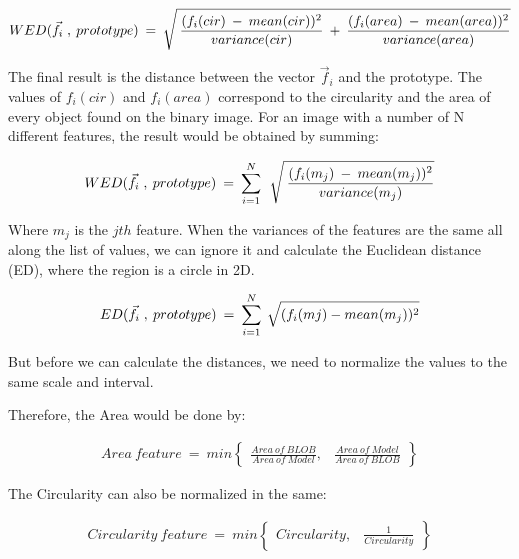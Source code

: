 \begin{equation}	
	\begin{aligned}
{WED(\vec{f}_{i} \; , \: prototype)} \: = \: \sqrt{\mathstrut \:  \displaystyle\frac{(f_{i}(cir) \: - \: mean(cir))^2}{variance(cir)} \: + \: \displaystyle\frac{(f_{i}(area) \: - \: mean(area))^2}{variance(area)}}
\label{Euclidean}
	\end{aligned}
\end{equation}

The final result is the distance between the vector {$\vec{f}_{i}$} and the prototype. The values of {$f_{i}(cir)$} and {$f_{i}(area)$} correspond to the circularity and the area of every object found on the binary image. For an image with a number of N different features, the result would be obtained by summing:


\begin{equation}	
	\begin{aligned}
{WED(\vec{f}_{i} \; , \: prototype)} \: = \: \displaystyle\sum_{i=1}^N \: \: \sqrt{\mathstrut \:  \displaystyle\frac{(f_{i}(m_{j}) \: - \: mean(m_{j}))^2}{variance(m_{j})}}
\label{Euclidean1}
	\end{aligned}
\end{equation}

Where {$m_{j}$} is the {$jth$} feature. When the variances of the features are the same all along the list of values, we can ignore it and calculate the Euclidean distance (ED), where the region is a circle in 2D.

\begin{equation}	
	\begin{aligned}
{ED(\vec{f}_{i} \; , \: prototype)} \: = \: \displaystyle\sum_{i=1}^N \: \sqrt{\mathstrut (f_{i}(m{j}) - mean(m_{j}))^2}
\label{Euclidean2}
	\end{aligned}
\end{equation}

But before we can calculate the distances, we need to normalize the values to the same scale and interval.

Therefore, the Area would be done by:

\begin{equation}	
	\begin{aligned}
{Area \: feature} \: = \: min \begin{Bmatrix} \displaystyle\frac{Area\:of\:BLOB}{Area\:of\:Model}, & \displaystyle\frac{Area\:of\:Model}{Area\:of\:BLOB}\end{Bmatrix}
\label{NormArea}
	\end{aligned}
\end{equation}

The Circularity can also be normalized in the same:

\begin{equation}	
	\begin{aligned}
{Circularity \: feature} \: = \: min \begin{Bmatrix} {Circularity}, & \displaystyle\frac{1}{Circularity}\end{Bmatrix}
\label{NormCirc}
	\end{aligned}
\end{equation}
